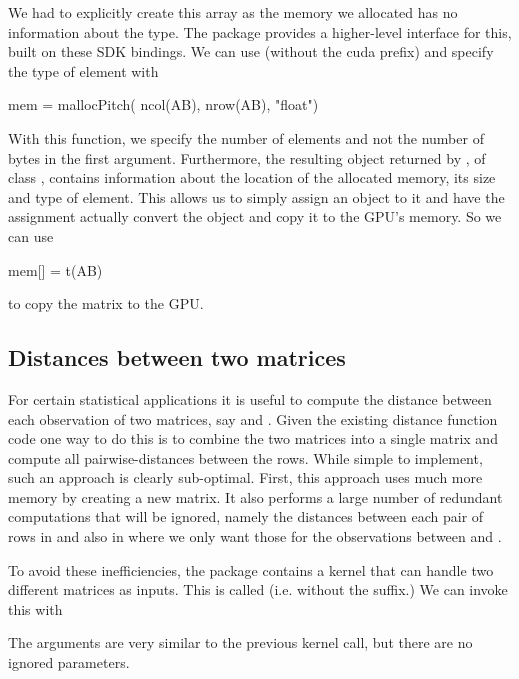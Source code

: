 We had to explicitly create this array as the memory we allocated
has no information about the type.
The  package provides a higher-level interface
for this, built on these SDK bindings.
We can use  (without the cuda prefix)
and specify the type of element with
\begin{RCode}
mem = mallocPitch( ncol(AB), nrow(AB), "float")
\end{RCode}
With this function, we specify the number of elements and not the
number of bytes in the first argument.  Furthermore, the resulting
object returned by , of class ,
contains information about the location of the allocated memory,
its size and type of element.
This allows us to simply assign an \R{}  object to it and
have the assignment actually convert the \R{} object and copy it
to the GPU's memory.
So we can use
\begin{RCode}
mem[] = t(AB)
\end{RCode}
to copy the matrix to the GPU.




\subsection{Distances between two matrices}
For certain statistical applications it is useful to compute the distance between
each observation of two matrices, say  and .  Given the
existing distance function code one way to do this is to combine the two
matrices into a single matrix and compute all pairwise-distances between the
rows. While simple to implement, such an approach is clearly sub-optimal.
First, this approach uses much more memory by creating a new matrix.  It
also performs a large number of redundant computations that will be
ignored, namely the distances between each pair of rows in 
and also in  where we only want those for the observations
between  and .

To avoid these inefficiencies, the  package contains
 a kernel that can handle two
different matrices as inputs.  This is called
 (i.e. without the  suffix.)
We can invoke this with 
The arguments are very similar to the previous kernel call,
but there are no ignored parameters.

